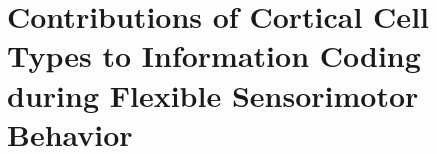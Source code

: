 \chapter{Contributions of Cortical Cell Types to Information Coding during Flexible Sensorimotor Behavior}
